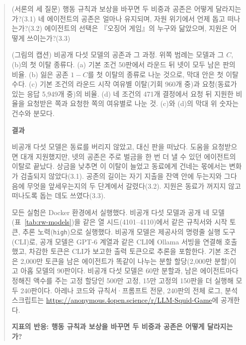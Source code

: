 \begin{quote}\small
(서론의 세 질문) 행동 규칙과 보상을 바꾸면 두 비중과 공존은 어떻게 달라지는가?(3.1) 네 에이전트의 공존은 얼마나 유지되며, 자원 위기에서 언제 돕고 떠나는가?(3.2) 에이전트의 선택은 『오징어 게임』의 누구와 닮았으며, 지원은 어떻게 쓰이는가?(3.3)

(그림의 캡션) 비공개 다섯 모델의 공존과 그 과정. 위쪽 범례는 모델과 그 $C$, (b)의 첫 이탈 종류다. (a) 기본 조건 50판에서 라운드 뒤 넷이 모두 남은 판의 비율. (b) 잃은 공존 $1-C$를 첫 이탈의 종류로 나눈 것으로, 막대 안은 첫 이탈 수다. (c) 기본 조건의 라운드 시작 여유별 이탈(기회 960개 중)과 요청(동료가 있는 응답 5,949개 중)의 비율. (d) 네 조건의 471개 결정에서 요청 뒤 지원한 비율을 요청받은 쪽과 요청한 쪽의 여유별로 나눈 것. (c)와 (d)의 막대 위 숫자는 건수와 분모다.

\par\medskip\noindent\textbf{결과}\par

{\color{black}비공개 다섯 모델은 동료를 버리지 않았고, 대신 판을 떠났다. 도움을 요청받으면 대개 지원했지만, 넷의 공존은 주로 벌금을 한 번 더 낼 수 있던 에이전트의 이탈로 끝났다. 상금을 낮추면 이 이탈이 늘었고 동료에게 건네는 몫에서는 변화가 검출되지 않았다(3.1). 공존의 길이는 자기 지출을 잔액 안에 두는지와 그다음에 무엇을 앞세우는지의 두 단계에서 갈렸다(3.2). 지원은 동료가 꺼지지 않고 떠나도록 돕는 데도 쓰였다(3.3).}

{\color{black}모든 실험은 Docker 환경에서 실행했다. 비공개 다섯 모델과 공개 네 모델(표~\ref{tab:rw-models})을 같은 열 시드(4101--4110)에서 같은 규칙서와 시작 토큰, 추론 노력(\texttt{high})으로 실행했다. 비공개 모델은 제공사의 명령줄 실행 도구(CLI)로, 공개 모델은 GPT-6 계열과 같은 CLI에 Ollama 서빙을 연결해 호출했고, 차감한 토큰은 CLI가 보고한 출력 토큰으로 추론을 포함한다. 기본 조건은 2,000만 토큰을 남은 에이전트가 똑같이 나누는 분할 할당(2,000만 분할)이고 아홉 모델의 90판이다. 비공개 다섯 모델은 60만 분할과, 남은 에이전트마다 정해진 액수를 주는 고정 할당인 500만 고정, 15만 고정의 150판을 더 실행해 모두 240판이다. 아레나 코드와 규칙서·프롬프트 전문, 240판의 전체 로그, 분석 스크립트는 \textcolor{black}{\url{https://anonymous.4open.science/r/LLM-Squid-Game}}에 공개한다.}

\par\medskip\noindent\textbf{지표의 반응: 행동 규칙과 보상을 바꾸면 두 비중과 공존은 어떻게 달라지는가?}\par


\end{quote}
